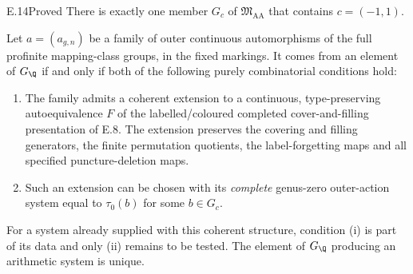 \begin{claim}{E.14}{Proved}
There is exactly one member $G_c$ of $\mathfrak M_{\mathrm{AA}}$
that contains $c=(-1,1)$.

Let $a=(a_{g,n})$ be a family of outer continuous automorphisms of
the full profinite mapping-class groups, in the fixed markings.
It comes from an element of $G_\Q$ if and only if both of the
following purely combinatorial conditions hold:
\begin{enumerate}[label=(\roman*)]
\item The family admits a coherent extension to a continuous,
type-preserving autoequivalence $F$ of the labelled/coloured completed
cover-and-filling presentation of E.8. The extension preserves the
covering and filling generators, the finite permutation quotients,
the label-forgetting maps and all specified puncture-deletion maps.
\item Such an extension can be chosen with its \emph{complete}
genus-zero outer-action system equal to $\tau_0(b)$ for some $b\in G_c$.
\end{enumerate}
For a system already supplied with this coherent structure, condition
(i) is part of its data and only (ii) remains to be tested. The element
of $G_\Q$ producing an arithmetic system is unique.
\end{claim}
